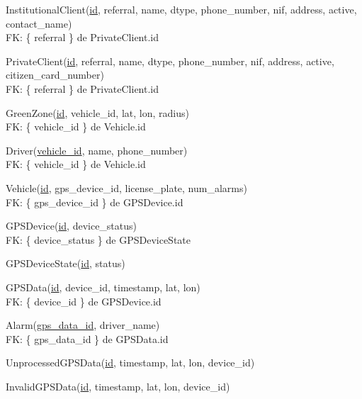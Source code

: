 \documentclass[parskip=full]{scrreprt}
\author{André Páscoa A48089}
\date{03/04/2022}
\begin{document}

    InstitutionalClient(\underline{id}, referral, name, dtype, phone\_number, nif, address, active, contact\_name)\\
    FK: \{ referral \} de PrivateClient.id

    PrivateClient(\underline{id}, referral, name, dtype, phone\_number, nif,
    address, active, citizen\_card\_number)\\
    FK: \{ referral \} de PrivateClient.id

    GreenZone(\underline{id}, vehicle\_id, lat, lon, radius)\\
    FK: \{ vehicle\_id \} de Vehicle.id

    Driver(\underline{vehicle\_id}, name, phone\_number)\\
    FK: \{ vehicle\_id \} de Vehicle.id

    Vehicle(\underline{id}, gps\_device\_id, license\_plate, num\_alarms)\\
    FK: \{ gps\_device\_id \} de GPSDevice.id

    GPSDevice(\underline{id}, device\_status)\\
    FK: \{ device\_status \} de GPSDeviceState

    GPSDeviceState(\underline{id}, status)

    GPSData(\underline{id}, device\_id, timestamp, lat, lon)\\
    FK: \{ device\_id \} de GPSDevice.id

    Alarm(\underline{gps\_data\_id}, driver\_name)\\
    FK: \{ gps\_data\_id \} de GPSData.id

    UnprocessedGPSData(\underline{id}, timestamp, lat, lon, device\_id)

    InvalidGPSData(\underline{id}, timestamp, lat, lon, device\_id)
\end{document}
